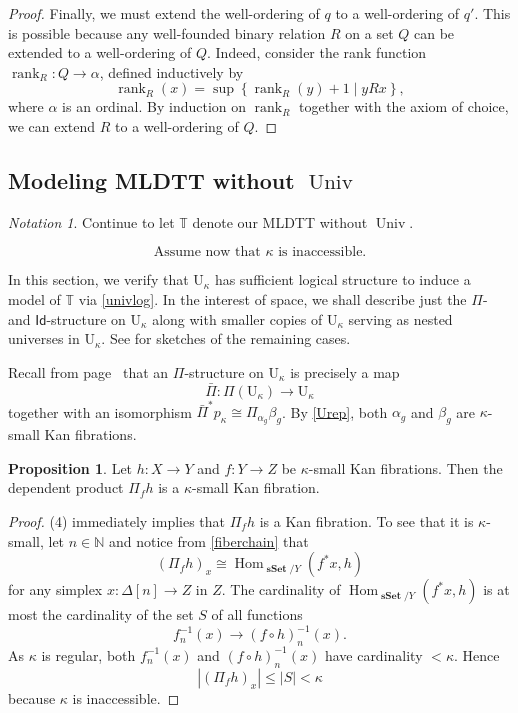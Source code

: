 \documentclass[10pt,letterpaper,cm]{nupset}
\theoremstyle{definition}
\theoremstyle{theorem}
\newtheorem{prop}[definition]{Proposition}
\theoremstyle{remark}
\newtheorem*{notation}{Notation}
\newcommand{\id}{\mathsf{Id}}
\newcommand{\0}{\mathbf{0}}
\newcommand{\1}{\mathbf{1}}
\newcommand{\2}{\mathbf{2}}
\DeclareMathOperator{\univ}{\mathrm{Univ}}
\DeclareMathOperator{\sset}{\mathbf{sSet}}
\DeclareMathOperator{\rank}{rank}
\newcommand{\N}{\mathbb N}
\newcommand{\T}{\mathbb T}
\DeclareMathOperator{\Hom}{Hom}
\begin{document}
\begin{proof}
\medskip



Finally, we must extend the well-ordering of $q$ to a well-ordering of $q'$. This is possible because any well-founded binary relation $R$ on a set $Q$ can be extended to a well-ordering of $Q$. Indeed, consider  the rank function $\rank_R: Q\to \alpha$, defined inductively by 
\[
\rank_R(x) = \sup{\left\{\rank_R(y)+1\mid {yRx}\right\}},
\] where $\alpha$ is an ordinal. By induction on $\rank_R$ together with the axiom of choice, we can extend $R$ to a well-ordering of $Q$.
\end{proof} 

\subsection{Modeling MLDTT without $\univ$}\label{smod}

\begin{notation}
Continue to let $\T$ denote our MLDTT without $\univ$.
\end{notation}

\[
\text{Assume now that $\kappa$ is inaccessible.}
\]

\smallskip

In this section, we verify that $\mathrm{U}_{\kappa}$ has sufficient logical structure to induce a model of $\T$ via \cref{univlog}. In the interest of space, we shall describe just the $\Pi$- and $\id$-structure on $\mathrm{U}_{\kappa}$ along with smaller copies of  $\mathrm{U}_{\kappa}$ serving as nested universes in  $\mathrm{U}_{\kappa}$. See \cite[Theorem 2.3.4]{KL} for sketches of the remaining cases. 


\bigskip

Recall from page~\pageref{depprods} that  an $\Pi$-structure on $\mathrm{U}_{\kappa}$ is precisely a map $$\bar{\Pi} : \Pi\left(\mathrm{U}_{\kappa}\right) \to \mathrm{U}_{\kappa}$$ together with an isomorphism $\bar{\Pi}^{\ast}{p_{\kappa}}\cong \Pi_{\alpha_g}\beta_g$. By \cref{Urep}, both $\alpha_g$ and $\beta_g$ are  $\kappa$-small Kan fibrations.

\begin{prop}\label{depprodsmall}
Let $h : X \to Y$ and $f: Y \to Z$ be $\kappa$-small Kan fibrations. Then the dependent product $\Pi_f{h}$ is a $\kappa$-small Kan fibration.  
\end{prop}
\begin{proof}
 (4) immediately implies that $\Pi_f{h}$ is a Kan fibration. To see that it is $\kappa$-small,  let $n\in \N$ and notice from \eqref{fiberchain} that
 \[
\left(\Pi_f{h}\right)_x \cong \Hom_{\sset/Y}(f^{\ast}{x}, h)
 \] for any simplex $x: \Delta[n] \to Z$ in $Z$. The cardinality of $\Hom_{\sset/Y}(f^{\ast}{x}, h)$ is at most the cardinality of the set $S$ of all functions
 \[
f_n^{-1}(x) \to \left(f\circ h\right)_n^{-1}(x)
 .\] As $\kappa$ is regular, both $f_n^{-1}(x)$ and $\left(f\circ h\right)_n^{-1}(x) $ have cardinality $<\kappa$. Hence $$\left\lvert{\left(\Pi_f{h}\right)_x}\right\rvert \leq \left\lvert{S}\right\rvert <\kappa$$ because $\kappa$ is inaccessible.
 \end{proof}
\end{document}
